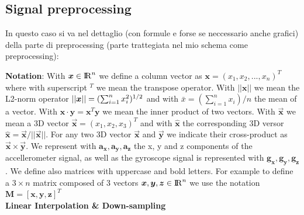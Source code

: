 \subsection{Signal preprocessing}

In questo caso si va nel dettaglio (con formule e forse se neccessario anche grafici) della parte di preprocessing (parte trattegiata nel mio schema come preprocessing):

\textbf{Notation}: With $\boldsymbol{x} \in {\rm I\!R}^{n}$ we define a column vector as $\boldsymbol{x}=(x_{1}, x_{2}, ..., x_{n})^{T}$ where with superscript $^T$ we mean the transpose operator. With $\boldsymbol{||x||}$ we mean the L2-norm operator $||\boldsymbol{x}|| = (\sum_{i=1}^{n} x_{i}^{2})^{1/2}$ and with $\bar{x} = (\sum_{i=1}^{n} x_{i}) / n$ the mean of a vector. With $\boldsymbol{x} \cdot \boldsymbol{y} =\boldsymbol{x}^{T}\boldsymbol{y} $ we mean the inner product of two vectors. With $\boldsymbol{\vec{x}}$ we mean a 3D vector $\boldsymbol{\vec{x}} = (x_{1}, x_{2}, x_{3})^{T}$ and with $\boldsymbol{\hat{x}}$ the corresponding 3D versor $\boldsymbol{\hat{x}}=\boldsymbol{\vec{x}}/ ||\boldsymbol{\vec{x}}||$. For any two 3D vector $\boldsymbol{\vec{x}}$ and $\boldsymbol{\vec{y}}$ we indicate their cross-product as $\boldsymbol{\vec{x}} \times \boldsymbol{\vec{y}}$. We represent with $\boldsymbol{a_{x}}, \boldsymbol{a_{y}}, \boldsymbol{a_{z}}$ the x, y and z components of the accellerometer signal, as well as the gyroscope signal is represented with $\boldsymbol{g_{x}}, \boldsymbol{g_{y}}, \boldsymbol{g_{z}}$. We define also matrices with uppercase and bold letters. For example to define a $3 \times n$ matrix composed of 3 vectors \mbox{$\boldsymbol{x}, \boldsymbol{y}, \boldsymbol{z} \in {\rm I\!R}^{n}$} we use the notation \mbox{$\boldsymbol{M} = [\boldsymbol{x}, \boldsymbol{y}, \boldsymbol{z}]^{T}$}\\

\textbf{Linear Interpolation \& Down-sampling}\\

